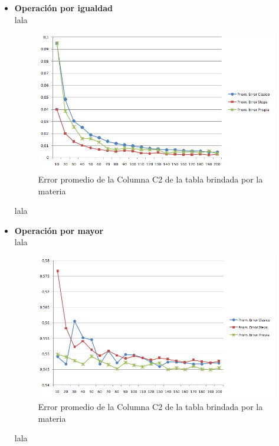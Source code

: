 \begin{itemize}
\item \textbf{Operaci\'on por igualdad} \\

\quad lala \\

\begin{figure}[H]
	  \begin{center}
	    \includegraphics[scale=.80]{imagenes/parametroVariableC2Eq.png}
	    \caption{Error promedio de la Columna C2 de la tabla brindada por la materia} 
	    \label{fig:C2_variando_valor}
	  \end{center}
\end{figure}

\quad lala \\

\item \textbf{Operaci\'on por mayor} \\

\quad lala \\

\begin{figure}[H]
	  \begin{center}
	    \includegraphics[scale=.80]{imagenes/parametroVariableC2Greater.png}
	    \caption{Error promedio de la Columna C2 de la tabla brindada por la materia} 
	    \label{fig:C2_variando_valor}
	  \end{center}
\end{figure}

\quad lala \\

\end{itemize}